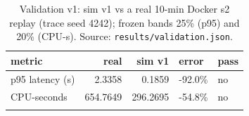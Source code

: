 \begin{table}[htbp]
\centering
\footnotesize
\caption{Validation v1: sim v1 vs a real 10-min Docker s2 replay (trace seed 4242); frozen bands 25\% (p95) and 20\% (CPU-s). Source: \texttt{results/validation.json}.}
\label{tab:valv1}
\setlength{\tabcolsep}{3pt}
\begin{tabular}{lrrll}
\toprule
\textbf{metric} & \textbf{real} & \textbf{sim v1} & \textbf{error} & \textbf{pass} \\
\midrule
p95 latency (s) & 2.3358 & 0.1859 & -92.0\% & no \\
CPU-seconds & 654.7649 & 296.2695 & -54.8\% & no \\
\botrule
\end{tabular}
\end{table}
